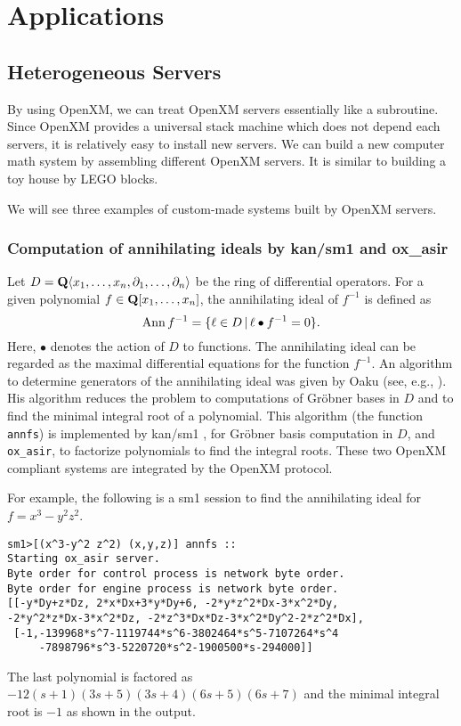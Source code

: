 \section{Applications}

\subsection{Heterogeneous Servers}

\def\pd#1{ \partial_{#1} }

By using OpenXM, we can treat OpenXM servers essentially 
like a subroutine.
Since OpenXM provides a universal stack machine which does not
depend each servers, 
it is relatively easy to install new servers.
We can build a new computer math system by assembling
different OpenXM servers.
It is similar to building a toy house by LEGO blocks.

We will see three examples of custom-made systems
built by OpenXM servers.

\subsubsection{Computation of annihilating ideals by kan/sm1 and ox\_asir}

Let $D = {\bf Q} \langle x_1, \ldots, x_n , \pd{1}, \ldots, \pd{n} \rangle$
be the ring of differential operators.
For a given polynomial
$ f \in {\bf Q}[x_1, \ldots, x_n] $,
the annihilating ideal of $f^{-1}$ is defined as
$$ {\rm Ann}\, f^{-1} = \{ \ell \in D \,|\,
  \ell \bullet f^{-1} = 0 \}.
$$
Here, $\bullet$ denotes the action of $D$ to functions.
The annihilating ideal can be regarded as the maximal differential
equations for the function $f^{-1}$.
An algorithm to determine generators of the annihilating ideal
was given by Oaku (see, e.g., \cite[5.3]{sst-book}).
His algorithm reduces the problem to computations of Gr\"obner bases
in $D$ and to find the minimal integral root of a polynomial.
This algorithm (the function {\tt annfs}) is implemented by
kan/sm1 \cite{kan}, for Gr\"obner basis computation in $D$, and
{\tt ox\_asir}, to factorize polynomials to find the integral
roots.
These two OpenXM compliant systems are integrated by
the OpenXM protocol.

For example, the following is a sm1 session to find the annihilating
ideal for $f = x^3 - y^2 z^2$.
\begin{verbatim}
sm1>[(x^3-y^2 z^2) (x,y,z)] annfs ::
Starting ox_asir server.
Byte order for control process is network byte order.
Byte order for engine process is network byte order.
[[-y*Dy+z*Dz, 2*x*Dx+3*y*Dy+6, -2*y*z^2*Dx-3*x^2*Dy, 
-2*y^2*z*Dx-3*x^2*Dz, -2*z^3*Dx*Dz-3*x^2*Dy^2-2*z^2*Dx], 
 [-1,-139968*s^7-1119744*s^6-3802464*s^5-7107264*s^4
     -7898796*s^3-5220720*s^2-1900500*s-294000]] 
\end{verbatim}
The last polynomial is factored as
$-12(s+1)(3s+5)(3s+4)(6s+5)(6s+7)$
and the minimal integral root is $-1$
as shown in the output.

